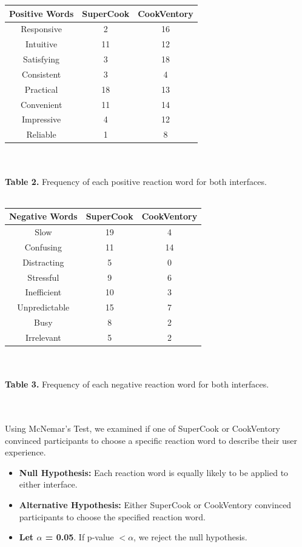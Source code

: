 \documentclass{sigchi}
\begin{document}
\begin{center}
	\begin{tabular}{ |c|c|c| }
		\hline 
        	Positive Words & SuperCook & CookVentory \\ 
		\hline
			Responsive & 2 & 16\\
			Intuitive & 11 & 12\\
			Satisfying & 3 & 18\\
			Consistent & 3 & 4\\
			Practical & 18 & 13\\
			Convenient & 11 & 14 \\
			Impressive & 4& 12\\
			Reliable & 1 & 8\\
		\hline
	\end{tabular}
	\\~\\
	\textbf{Table 2.} Frequency of each positive reaction word for both interfaces. \\~\\
    
	\begin{tabular}{ |c|c|c| }
		\hline
			Negative Words & SuperCook & CookVentory \\ 
		\hline
			Slow & 19 & 4\\
			Confusing & 11 & 14\\
			Distracting & 5 & 0\\
			Stressful & 9 & 6\\
			Inefficient & 10 & 3\\
			Unpredictable & 15 & 7 \\
			Busy & 8& 2\\
			Irrelevant & 5 & 2\\
		\hline
	\end{tabular}
	\\~\\
	\textbf{Table 3.} Frequency of each negative reaction word for both interfaces.\\~\\~\\
\end{center} 

	Using McNemar's Test, we examined if one of SuperCook or CookVentory convinced participants to choose a specific reaction word to describe their user experience. 
    \begin{itemize}
	\item \textbf{Null Hypothesis:} Each reaction word is equally likely to be applied to either interface.
	\item \textbf{Alternative Hypothesis:} Either SuperCook or CookVentory convinced participants to choose the specified reaction word.
	\item \textbf{Let $\alpha$ = 0.05}. If p-value $< \alpha$, we reject the null hypothesis.
\end{itemize}
\end{document}
